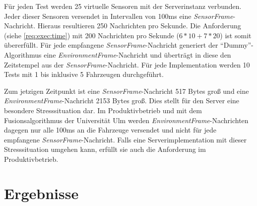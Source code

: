 Für jeden Test werden 25 virtuelle Sensoren mit der Serverinstanz verbunden.
Jeder dieser Sensoren versendet in Intervallen von 100ms eine \textit{SensorFrame}-Nachricht.
Hieraus resultieren 250 Nachrichten pro Sekunde.
Die Anforderung  (siehe \autoref{req:exec:time}) mit 200 Nachrichten pro Sekunde ($6*10 + 7*20$) ist somit übererfüllt.
Für jede empfangene \textit{SensorFrame}-Nachricht generiert der \enquote{Dummy}-Algorithmus eine \textit{EnvironmentFrame}-Nachricht und überträgt in diese den Zeitstempel aus der \textit{SensorFrame}-Nachricht.
Für jede Implementation werden 10 Tests mit 1 bis inklusive 5 Fahrzeugen durchgeführt.

Zum jetzigen Zeitpunkt ist eine \textit{SensorFrame}-Nachricht 517 Bytes groß und eine \textit{EnvironmentFrame}-Nachricht 2153 Bytes groß.
Dies stellt für den Server eine besondere Stresssituation dar.
Im Produktivbetrieb und mit dem Fusionsalgorithmus der Universität Ulm werden \textit{EnvironmentFrame}-Nachrichten dagegen nur alle 100ms an die Fahrzeuge versendet und nicht für jede empfangene \textit{SensorFrame}-Nachricht.
\todo{::} Falls eine Serverimplementation mit dieser Stresssituation umgehen kann, erfüllt sie auch die Anforderung  im Produktivbetrieb.

\section{Ergebnisse}


